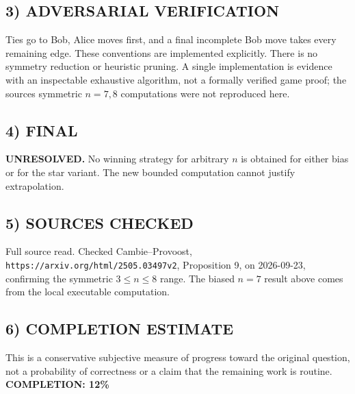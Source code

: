 \subsection{3) ADVERSARIAL VERIFICATION}
Ties go to Bob, Alice moves first, and a final incomplete Bob move takes every remaining edge. These conventions are implemented explicitly. There is no symmetry reduction or heuristic pruning. A single implementation is evidence with an inspectable exhaustive algorithm, not a formally verified game proof; the source\textquotesingle s symmetric $n=7,8$ computations were not reproduced here.
\subsection{4) FINAL}
\textbf{UNRESOLVED.}
No winning strategy for arbitrary $n$ is obtained for either bias or for the star variant. The new bounded computation cannot justify extrapolation.
\subsection{5) SOURCES CHECKED}
Full source read. Checked Cambie--Provoost, \texttt{https://arxiv.org/html/2505.03497v2}, Proposition 9, on 2026-09-23, confirming the symmetric $3\le n\le8$ range. The biased $n=7$ result above comes from the local executable computation.
\subsection{6) COMPLETION ESTIMATE}
This is a conservative subjective measure of progress toward the original question, not a probability of correctness or a claim that the remaining work is routine.
\textbf{COMPLETION: 12\%}
